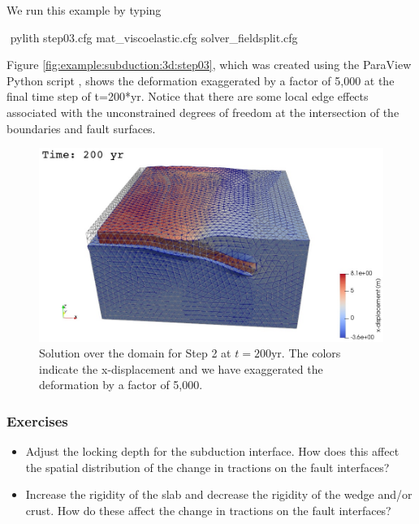 We run this example by typing
\begin{shell}
$$ pylith step03.cfg mat_viscoelastic.cfg solver_fieldsplit.cfg
\end{shell}

Figure \vref{fig:example:subduction:3d:step03}, which was created
using the ParaView Python script , shows
the deformation exaggerated by a factor of 5,000 at the final time
step of t=200*yr. Notice that there are some local edge effects
associated with the unconstrained degrees of freedom at the
intersection of the boundaries and fault surfaces.

\begin{figure}
  \includegraphics[width=5.0in]{examples/figs/subduction3d_step03_soln}
  \caption{Solution over the domain for Step 2 at $t=200 \mathrm{yr}$. The colors indicate
    the x-displacement and we have exaggerated the
    deformation by a factor of 5,000.}
  \label{fig:example:subduction:3d:step03}
\end{figure}


\subsubsection{Exercises}

\begin{itemize}
\item Adjust the locking depth for the subduction interface. How does this
  affect the spatial distribution of the change in tractions on
  the fault interfaces?
\item Increase the rigidity of the slab and decrease the rigidity of
  the wedge and/or crust. How do these affect the change in tractions
  on the fault interfaces?
\end{itemize}


